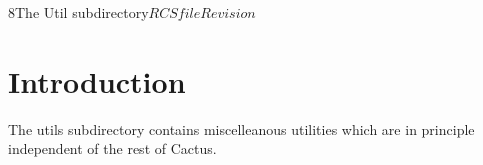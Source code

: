 %   

\begin{cactuspart}{8}{The Util subdirectory}{$RCSfile$}{$Revision$}
\renewcommand{\thepage}{\Alph{part}\arabic{page}}

\chapter{Introduction}

The utils subdirectory contains miscelleanous utilities which are in 
principle independent of the rest of Cactus.

\end{cactuspart}

